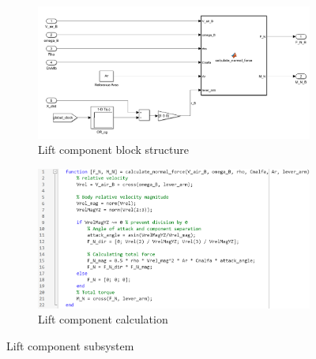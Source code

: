 \begin{figure}[ht]
    \centering
    \begin{subfigure}{0.45\textwidth}
        \centering
        \includegraphics[width=0.9\linewidth]{images-plant/sim_lift_block.png}
        \caption{Lift component block structure}
        \label{fig:lift-component-block}
    \end{subfigure}
    \begin{subfigure}{0.54\textwidth}
        \centering
        \includegraphics[width=0.9\linewidth]{images-plant/sim_lift_equation.png}
        \caption{Lift component calculation}
        \label{fig:lift-component-eq}
    \end{subfigure}
    \caption{Lift component subsystem}
    \label{fig:lift-component}
\end{figure}

